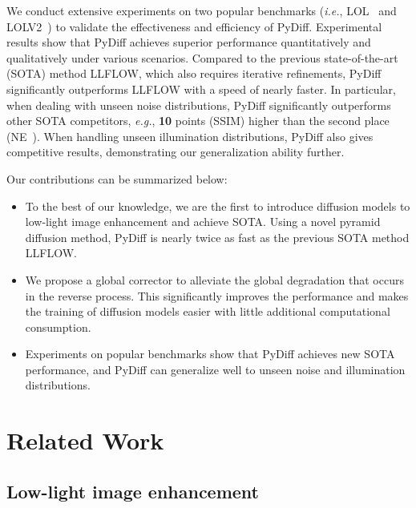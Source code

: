 \documentclass{article}
\def\eg{\emph{e.g.}}
\def\ie{\emph{i.e.}}
\begin{document}
We conduct extensive experiments on two popular benchmarks (\ie, LOL~\cite{wei2018deep} and LOLV2~\cite{yang2021sparse}) to validate the effectiveness and efficiency of PyDiff. Experimental results show that PyDiff achieves superior performance quantitatively and qualitatively under various scenarios. Compared to the previous state-of-the-art (SOTA) method LLFLOW, which also requires iterative refinements, PyDiff significantly outperforms LLFLOW with a speed of nearly  faster. In particular, when dealing with unseen noise distributions, PyDiff significantly outperforms other SOTA competitors, \eg, \textbf{10} points (SSIM) higher than the second place (NE~\cite{jin2022unsupervised}). When handling unseen illumination distributions, PyDiff also gives competitive results, demonstrating our generalization ability further. 

Our contributions can be summarized below:

\begin{itemize}
    \item To the best of our knowledge, we are the first to introduce diffusion models to low-light image enhancement and achieve SOTA. Using a novel pyramid diffusion method, PyDiff is nearly twice as fast as the previous SOTA method LLFLOW.
    \item We propose a global corrector to alleviate the global degradation that occurs in the reverse process. This significantly improves the performance and makes the training of diffusion models easier with little additional computational consumption.
    \item Experiments on popular benchmarks show that PyDiff achieves new SOTA performance, and PyDiff can generalize well to unseen noise and illumination distributions.
\end{itemize}


\section{Related Work}



\subsection{Low-light image enhancement}
\end{document}
